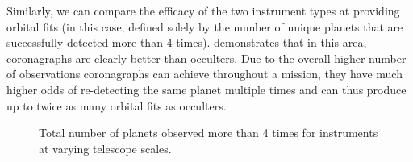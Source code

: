  Similarly, we can compare the efficacy of the two instrument types at providing orbital fits (in this case, defined solely by the number of unique planets that are successfully detected more than 4 times).  demonstrates that in this area, coronagraphs are clearly better than occulters.  Due to the overall higher number of observations coronagraphs can achieve throughout a mission, they have much higher odds of re-detecting the same planet multiple times and can thus produce up to twice as many orbital fits as occulters.
   \begin{figure}[ht]
 \centering
{}
\caption[Orbital fits]{ \label{fig:orbFits} Total number of planets observed more than 4 times for instruments at varying telescope scales.}
 \end{figure}  
 

